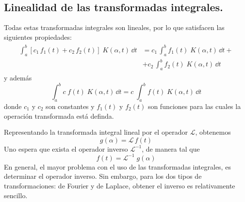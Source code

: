 \subsection{Linealidad de las transformadas integrales.}
Todas estas transformadas integrales son lineales, por lo que satisfacen las siguientes propiedades:
\begin{align}
\begin{aligned}
\int_{a}^{b} [ c_{1} \, f_{1} (t) + c_{2} \, f_{2}(t)] \; K(\alpha, t) \, \dd t &= c_{1} \, \int_{a}^{b} f_{1} (t) \; K(\alpha, t) \, \dd t + \\
&+ c_{2} \, \int_{a}^{b} f_{2} (t) \; K(\alpha, t) \, \dd t
\end{aligned}
\label{eq:ecuacion_15_08} 
\end{align}
y además
\begin{equation}
\int_{a}^{b}  c \; f (t) \; K(\alpha, t) \, \dd t =  c \; \int_{a}^{b} f (t) \; K(\alpha, t) \, \dd t
\label{eq:ecuacion_15_09}
\end{equation}
donde $c_{1}$ y $c_{2}$ son constantes y $f_{1}(t)$ y $f_{2}(t)$ son funciones para las cuales la operación transformada está definda.
\par
Representando la transformada integral lineal por el operador $\mathcal{L}$, obtenemos
\begin{equation}
g (\alpha) = \mathcal{L} \, f(t)
\label{eq:ecuacion_15_10}
\end{equation}
Uno espera que exista el operador inverso $\mathcal{L}^{-1}$, de manera tal que
\begin{equation}
f(t) = \mathcal{L}^{-1}  \; g (\alpha)
\label{eq:ecuacion_15_11}
\end{equation}
En general, el mayor problema con el uso de las transformadas integrales, es determinar el operador inverso. Sin embargo, para los dos tipos de transformaciones: de Fourier y de Laplace, obtener el inverso es relativamente sencillo.
